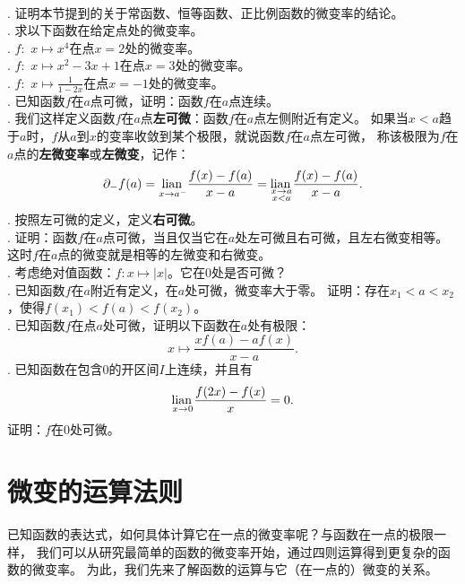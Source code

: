 \documentclass[12pt,UTF8]{ctexbook}
\begin{document}
\begin{xt}
    \mbox{} \\
    . 证明本节提到的关于常函数、恒等函数、正比例函数的微变率的结论。\\
    . 求以下函数在给定点处的微变率。\\
    . $f: \,\, x \mapsto x^4$在点$x = 2$处的微变率。\\
    . $f: \,\, x \mapsto x^2 - 3x + 1$在点$x = 3$处的微变率。\\
    . $f: \,\, x \mapsto \frac{1}{1 - 2x}$在点$x = -1$处的微变率。\\
    . 已知函数$f$在$a$点可微，证明：函数$f$在$a$点连续。\\
    . 我们这样定义函数$f$在$a$点\textbf{左可微}：函数$f$在$a$点左侧附近有定义。
    如果当$x<a$趋于$a$时，$f$从$a$到$x$的变率收敛到某个极限，就说函数$f$在$a$点左可微，
    称该极限为$f$在$a$点的\textbf{左微变率}或\textbf{左微变}，记作：
    $$ \partial_- f(a) = \underset{x\to a^-}{\operatorname{lian}\,} \frac{f(x) - f(a)}{x - a} = \underset{\substack{x\to a \\ x < a}}{\operatorname{lian}\,} \frac{f(x) - f(a)}{x - a}. $$
    . 按照左可微的定义，定义\textbf{右可微}。\\
    . 证明：函数$f$在$a$点可微，当且仅当它在$a$处左可微且右可微，且左右微变相等。
    这时$f$在$a$点的微变就是相等的左微变和右微变。\\
    . 考虑绝对值函数：$f:x\mapsto |x|$。它在$0$处是否可微？\\
    . 已知函数$f$在$a$附近有定义，在$a$处可微，微变率大于零。
    证明：存在$x_1 < a < x_2$，使得$f(x_1) < f(a) < f(x_2)$。\\
    . 已知函数$f$在点$a$处可微，证明以下函数在$a$处有极限：
    $$ x \mapsto \frac{xf(a) - af(x)}{x - a}.$$
    . 已知函数在包含$0$的开区间$I$上连续，并且有
    $$ \underset{x\to 0}{\operatorname{lian}\,} \frac{f(2x) - f(x)}{x} = 0.$$
    \indent 证明：$f$在$0$处可微。
\end{xt}

\section{微变的运算法则}
已知函数的表达式，如何具体计算它在一点的微变率呢？与函数在一点的极限一样，
我们可以从研究最简单的函数的微变率开始，通过四则运算得到更复杂的函数的微变率。
为此，我们先来了解函数的运算与它（在一点的）微变的关系。
\end{document}
